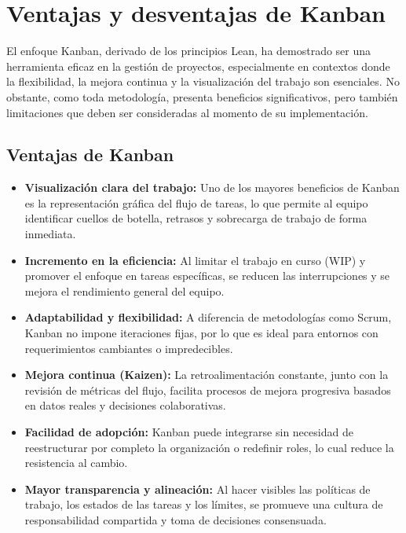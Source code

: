 \section{Ventajas y desventajas de Kanban}

El enfoque Kanban, derivado de los principios Lean, ha demostrado ser una herramienta eficaz en la gestión de proyectos, especialmente en contextos donde la flexibilidad, la mejora continua y la visualización del trabajo son esenciales. No obstante, como toda metodología, presenta beneficios significativos, pero también limitaciones que deben ser consideradas al momento de su implementación.

\subsection{Ventajas de Kanban}

\begin{itemize}
    \item \textbf{Visualización clara del trabajo:} Uno de los mayores beneficios de Kanban es la representación gráfica del flujo de tareas, lo que permite al equipo identificar cuellos de botella, retrasos y sobrecarga de trabajo de forma inmediata.
    
    \item \textbf{Incremento en la eficiencia:} Al limitar el trabajo en curso (WIP) y promover el enfoque en tareas específicas, se reducen las interrupciones y se mejora el rendimiento general del equipo.
    
    \item \textbf{Adaptabilidad y flexibilidad:} A diferencia de metodologías como Scrum, Kanban no impone iteraciones fijas, por lo que es ideal para entornos con requerimientos cambiantes o impredecibles.
    
    \item \textbf{Mejora continua (Kaizen):} La retroalimentación constante, junto con la revisión de métricas del flujo, facilita procesos de mejora progresiva basados en datos reales y decisiones colaborativas.
    
    \item \textbf{Facilidad de adopción:} Kanban puede integrarse sin necesidad de reestructurar por completo la organización o redefinir roles, lo cual reduce la resistencia al cambio.
    
    \item \textbf{Mayor transparencia y alineación:} Al hacer visibles las políticas de trabajo, los estados de las tareas y los límites, se promueve una cultura de responsabilidad compartida y toma de decisiones consensuada.
\end{itemize}

